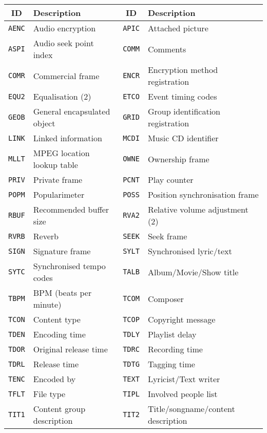 \begin{table}[h]
{
\begin{tabular}{|c|l||c|l|}
\hline
ID & Description & ID & Description \\
\hline
\texttt{AENC} & Audio encryption & \texttt{APIC} & Attached picture \\
\texttt{ASPI} & Audio seek point index & \texttt{COMM} & Comments \\
\texttt{COMR} & Commercial frame & \texttt{ENCR} & Encryption method registration \\
\texttt{EQU2} & Equalisation (2) & \texttt{ETCO} & Event timing codes \\
\texttt{GEOB} & General encapsulated object & \texttt{GRID} & Group identification registration \\
\texttt{LINK} & Linked information & \texttt{MCDI} & Music CD identifier \\
\texttt{MLLT} & MPEG location lookup table & \texttt{OWNE} & Ownership frame \\
\texttt{PRIV} & Private frame & \texttt{PCNT} & Play counter \\
\texttt{POPM} & Popularimeter & \texttt{POSS} & Position synchronisation frame \\
\texttt{RBUF} & Recommended buffer size & \texttt{RVA2} & Relative volume adjustment (2) \\
\texttt{RVRB} & Reverb & \texttt{SEEK} & Seek frame \\
\texttt{SIGN} & Signature frame & \texttt{SYLT} & Synchronised lyric/text \\
\texttt{SYTC} & Synchronised tempo codes & \texttt{TALB} & Album/Movie/Show title \\
\texttt{TBPM} & BPM (beats per minute) & \texttt{TCOM} & Composer \\
\texttt{TCON} & Content type & \texttt{TCOP} & Copyright message \\
\texttt{TDEN} & Encoding time & \texttt{TDLY} & Playlist delay \\
\texttt{TDOR} & Original release time & \texttt{TDRC} & Recording time \\
\texttt{TDRL} & Release time & \texttt{TDTG} & Tagging time \\
\texttt{TENC} & Encoded by & \texttt{TEXT} & Lyricist/Text writer \\
\texttt{TFLT} & File type & \texttt{TIPL} & Involved people list \\
\texttt{TIT1} & Content group description & \texttt{TIT2} & Title/songname/content description \\

\end{tabular}}
\end{table}
